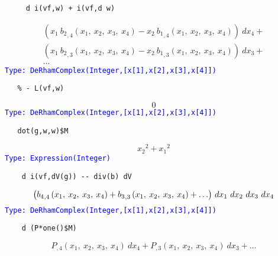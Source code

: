 \documentclass[12pt,a4paper]{article}
\newcommand{\type}[1]{\textcolor{blue}{\tt\tiny #1}}
\begin{document}
\begin{lstlisting}
     d i(vf,w) + i(vf,d w)
\end{lstlisting}
\begin{eqnarray*}
    {{\left( {{x _ {1}} \  {{{b _ {2}} _ {{,4}}} 
    \left({{x _ {1}}, \: {x _ {2}}, \: {x _ {3}}, \: {x _ {4}}} 
    \right)}}-{{x _ {2}} \  {{{b _ {1}} _ {{,4}}} 
    \left({{x _ {1}}, \: {x _ {2}}, \: {x _ {3}}, \: {x _ {4}}} 
    \right)}}\right)}
    \  {dx _ {4}}}+ \\ {{\left( {{x _ {1}} \  {{{b _ {2}} _ {{,3}}} 
    \left({{x _ {1}}, \: {x _ {2}}, \: {x _ {3}}, \: {x _ {4}}} 
    \right)}}-{{x _ {2}} \  {{{b _ {1}} _ {{,3}}} 
    \left({{x _ {1}}, \: {x _ {2}}, \: {x _ {3}}, \: {x _ {4}}} 
    \right)}}\right)}
    \  {dx _ {3}}}+ \\ \ldots 
\end{eqnarray*}
\type{Type: DeRhamComplex(Integer,[x[1],x[2],x[3],x[4]])}
\begin{lstlisting}
   % - L(vf,w)
\end{lstlisting}
\begin{displaymath}
   0
\end{displaymath}    
\type{Type: DeRhamComplex(Integer,[x[1],x[2],x[3],x[4]])}
\begin{lstlisting}
   dot(g,w,w)$M
\end{lstlisting}
\begin{displaymath}
   {{{x _ {2}}} ^ {2}}+{{{x _ {1}}} ^ {2}} 
\end{displaymath}    
\type{Type: Expression(Integer)}
\begin{lstlisting}
    d i(vf,dV(g)) -- div(b) dV
\end{lstlisting}
\begin{eqnarray*}
    \def\sp{^}\def\sb{_}\def\leqno(#1){}
    \def\erf{\mathrm{erf}}\def\sinh{\mathrm{sinh}}
    \def\zag#1#2{{{\left.{#1}\right|}\over{\left|{#2}\right.}}}
    \def\csch{\mathrm{csch}}
    {\left( {{{b \sb {4}} \sb {{,4}}} 
    \left(
    {{x \sb {1}}, \: {x \sb {2}}, \: {x \sb {3}}, \: {x \sb {4}}} 
    \right)}+{{b
    \sb {3}} \sb {{,3}}} 
    \left(
    {{x \sb {1}}, \: {x \sb {2}}, \: {x \sb {3}}, \: {x \sb {4}}} 
    \right) + \ldots \right)}
    \  dx \sb {1} \  dx \sb {2} \  dx \sb {3} \  dx \sb {4}   
\end{eqnarray*}
\type{Type: DeRhamComplex(Integer,[x[1],x[2],x[3],x[4]])}
\begin{lstlisting}
    d (P*one()$M)
\end{lstlisting}
\begin{displaymath}
    {{{P _ {{,4}}} 
    \left({{x _ {1}}, \: {x _ {2}}, \: {x _ {3}}, \: {x _ {4}}} 
    \right)}\  {dx _ {4}}}+{{{P _ {{,3}}} \left(
    {{x _ {1}}, \: {x _ {2}}, \: {x _ {3}}, \: {x _ {4}}} 
    \right)}\  {dx _ {3}}}+ \ldots
\end{displaymath}
\end{document}

